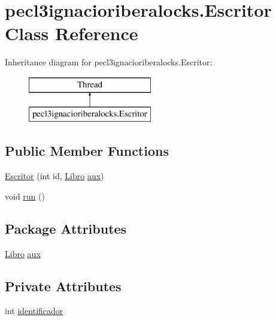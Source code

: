 \hypertarget{classpecl3ignacioriberalocks_1_1_escritor}{}\section{pecl3ignacioriberalocks.\+Escritor Class Reference}
\label{classpecl3ignacioriberalocks_1_1_escritor}
Inheritance diagram for pecl3ignacioriberalocks.\+Escritor\+:\begin{figure}[H]
\begin{center}
\leavevmode
\includegraphics[height=2.000000cm]{classpecl3ignacioriberalocks_1_1_escritor}
\end{center}
\end{figure}
\subsection*{Public Member Functions}
\begin{DoxyCompactItemize}
\item 
\mbox{\hyperlink{classpecl3ignacioriberalocks_1_1_escritor_a78d90f3839ce3e3db6431ed3e3c3d774}{Escritor}} (int id, \mbox{\hyperlink{classpecl3ignacioriberalocks_1_1_libro}{Libro}} \mbox{\hyperlink{classpecl3ignacioriberalocks_1_1_escritor_a9b5a1087cd14e067a353af97ca7515c9}{aux}})
\item 
void \mbox{\hyperlink{classpecl3ignacioriberalocks_1_1_escritor_a9daf2d28bfac0b7682e2f2a765c6562a}{run}} ()
\end{DoxyCompactItemize}
\subsection*{Package Attributes}
\begin{DoxyCompactItemize}
\item 
\mbox{\hyperlink{classpecl3ignacioriberalocks_1_1_libro}{Libro}} \mbox{\hyperlink{classpecl3ignacioriberalocks_1_1_escritor_a9b5a1087cd14e067a353af97ca7515c9}{aux}}
\end{DoxyCompactItemize}
\subsection*{Private Attributes}
\begin{DoxyCompactItemize}
\item 
int \mbox{\hyperlink{classpecl3ignacioriberalocks_1_1_escritor_a95d141e27b252a1c86ac193df9a56df1}{identificador}}
\end{DoxyCompactItemize}


